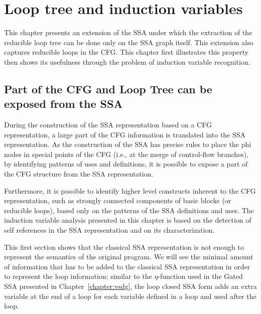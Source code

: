 \chapter{Loop tree and induction variables }
\label{chapter:loop_tree}
\graphicspath{{fig/}{loop_tree/fig/}{part3/loop_tree/fig/}}


\providecommand{\SSA}{SSA}
\providecommand{\CFG}{CFG}
\providecommand{\loopphi}{loop-$\phi$}
\providecommand{\closephi}{close-$\phi$}
\providecommand{\CHREC}[1]{\{#1\}}

This chapter presents an extension of the \SSA{} under which the
extraction of the reducible loop tree can be done only on the \SSA{}
graph itself.  This extension also captures reducible loops in the
CFG.  This chapter first illustrates this property then shows its
usefulness through the problem of induction variable recognition.

\section{Part of the \CFG{} and Loop Tree can be exposed from the \SSA{}}

During the construction of the \SSA{} representation based on a \CFG{}
representation, a large part of the \CFG{} information is translated
into the \SSA{} representation.  As the construction of the \SSA{} has
precise rules to place the phi nodes in special points of the \CFG{}
(i.e., at the merge of control-flow branches), by identifying patterns
of uses and definitions, it is possible to expose a part of the \CFG{} structure
from the \SSA{} representation.

Furthermore, it is possible to identify higher level constructs
inherent to the \CFG{} representation, such as strongly connected
components of basic blocks (or reducible loops), based only on the
patterns of the \SSA{} definitions and uses.  The induction variable
analysis presented in this chapter is based on the detection of self
references in the \SSA{} representation and on its characterization.

This first section shows that the classical \SSA{} representation is
not enough to represent the semantics of the original program.  We
will see the minimal amount of information that has to be added to the
classical \SSA{} representation in order to represent the loop
information: similar to the $\eta$-function used in the Gated \SSA{}
presented in Chapter~\ref{chapter:vsdg}, the loop closed \SSA{} form
adds an extra variable at the end of a loop for each variable defined
in a loop and used after the loop.

